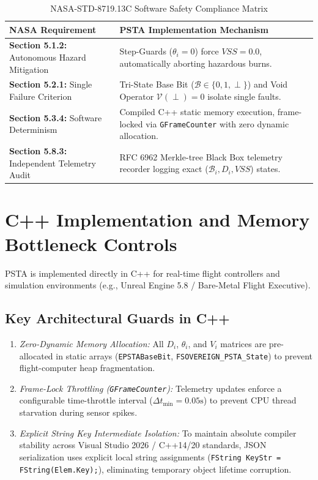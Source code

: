 \documentclass[journal]{IEEEtran}
\begin{document}
\begin{table}[htbp]
\caption{NASA-STD-8719.13C Software Safety Compliance Matrix}
\label{tab:nasa_compliance}
\begin{center}
\begin{tabular}{|p{3.2cm}|p{4.6cm}|}
\hline
\textbf{NASA Requirement} & \textbf{PSTA Implementation Mechanism} \\
\hline
\textbf{Section 5.1.2:} Autonomous Hazard Mitigation & Step-Guards ($\theta_i = 0$) force $VSS = 0.0$, automatically aborting hazardous burns. \\
\hline
\textbf{Section 5.2.1:} Single Failure Criterion & Tri-State Base Bit ($\mathcal{B} \in \{0,1,\perp\}$) and Void Operator $\mathcal{V}(\perp)=0$ isolate single faults. \\
\hline
\textbf{Section 5.3.4:} Software Determinism & Compiled C++ static memory execution, frame-locked via \texttt{GFrameCounter} with zero dynamic allocation. \\
\hline
\textbf{Section 5.8.3:} Independent Telemetry Audit & RFC 6962 Merkle-tree Black Box telemetry recorder logging exact ($\mathcal{B}_i, D_i, VSS$) states. \\
\hline
\end{tabular}
\end{center}
\end{table}

\section{C++ Implementation and Memory Bottleneck Controls}

PSTA is implemented directly in C++ for real-time flight controllers and simulation environments (e.g., Unreal Engine 5.8 / Bare-Metal Flight Executive).

\subsection{Key Architectural Guards in C++}
\begin{enumerate}
    \item \emph{Zero-Dynamic Memory Allocation:} All $D_i$, $\theta_i$, and $V_i$ matrices are pre-allocated in static arrays (\texttt{EPSTABaseBit}, \texttt{FSOVEREIGN\_PSTA\_State}) to prevent flight-computer heap fragmentation.
    \item \emph{Frame-Lock Throttling (\texttt{GFrameCounter}):} Telemetry updates enforce a configurable time-throttle interval ($\Delta t_{\text{min}} = 0.05\text{s}$) to prevent CPU thread starvation during sensor spikes.
    \item \emph{Explicit String Key Intermediate Isolation:} To maintain absolute compiler stability across Visual Studio 2026 / C++14/20 standards, JSON serialization uses explicit local string assignments (\texttt{FString KeyStr = FString(Elem.Key);}), eliminating temporary object lifetime corruption.
\end{enumerate}
\end{document}
